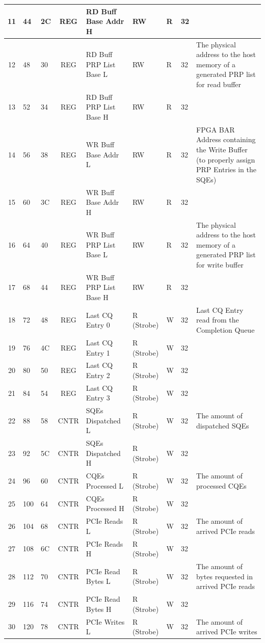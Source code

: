 \begin{landscape}
\begin{longtable}{|c|p{1.1cm}|p{1.1cm}|c|p{5.1cm}|p{1.4cm}|p{1.3cm}|p{1.3cm}|p{6cm}|}
11 & 44 & 2C & REG & RD Buff Base Addr H & RW & R & 32 &  \\ \hline
12 & 48 & 30 & REG & RD Buff PRP List Base L & RW & R & 32 & The physical address to the host memory of a generated PRP list for read buffer \\ \hline
13 & 52 & 34 & REG & RD Buff PRP List Base H & RW & R & 32 &  \\ \hline
14 & 56 & 38 & REG & WR Buff Base Addr L & RW & R & 32 & FPGA BAR Address containing the Write Buffer (to properly assign PRP Entries in the SQEs) \\ \hline
15 & 60 & 3C & REG & WR Buff Base Addr H & RW & R & 32 &  \\ \hline
16 & 64 & 40 & REG & WR Buff PRP List Base L & RW & R & 32 & The physical address to the host memory of a generated PRP list for write buffer \\ \hline
17 & 68 & 44 & REG & WR Buff PRP List Base H & RW & R & 32 &  \\ \hline
18 & 72 & 48 & REG & Last CQ Entry 0 & R (Strobe) & W & 32 & Last CQ Entry read from the Completion Queue \\ \hline
19 & 76 & 4C & REG & Last CQ Entry 1 & R (Strobe) & W & 32 &  \\ \hline
20 & 80 & 50 & REG & Last CQ Entry 2 & R (Strobe) & W & 32 &  \\ \hline
21 & 84 & 54 & REG & Last CQ Entry 3 & R (Strobe) & W & 32 &  \\ \hline
22 & 88 & 58 & CNTR & SQEs Dispatched L & R (Strobe) & W & 32 & The amount of dispatched SQEs \\ \hline
23 & 92 & 5C & CNTR & SQEs Dispatched H & R (Strobe) & W & 32 &  \\ \hline
24 & 96 & 60 & CNTR & CQEs Processed L & R (Strobe) & W & 32 & The amount of processed CQEs \\ \hline
25 & 100 & 64 & CNTR & CQEs Processed H & R (Strobe) & W & 32 &  \\ \hline
26 & 104 & 68 & CNTR & PCIe Reads L & R (Strobe) & W & 32 & The amount of arrived PCIe reads \\ \hline
27 & 108 & 6C & CNTR & PCIe Reads H & R (Strobe) & W & 32 &  \\ \hline
28 & 112 & 70 & CNTR & PCIe Read Bytes L & R (Strobe) & W & 32 & The amount of bytes requested in arrived PCIe reads \\ \hline
29 & 116 & 74 & CNTR & PCIe Read Bytes H & R (Strobe) & W & 32 &  \\ \hline
30 & 120 & 78 & CNTR & PCIe Writes L & R (Strobe) & W & 32 & The amount of arrived PCIe writes \\ \hline

\end{longtable}
\end{landscape}
